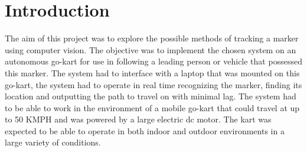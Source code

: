 \section{Introduction}

The aim of this project was to explore the possible methods of tracking a marker using computer vision. The objective was to implement the chosen system on an autonomous go-kart for use in following a leading person or vehicle that possessed this marker. The system had to interface with a laptop that was mounted on this go-kart, the system had to operate in real time recognizing the marker, finding its location and outputting the path to travel on with minimal lag. The system had to be able to work in the environment of a mobile go-kart that could travel at up to 50 KMPH and was powered by a large electric dc motor. The kart was expected to be able to operate in both indoor and outdoor environments in a large variety of conditions. \cite{yeah,lol}